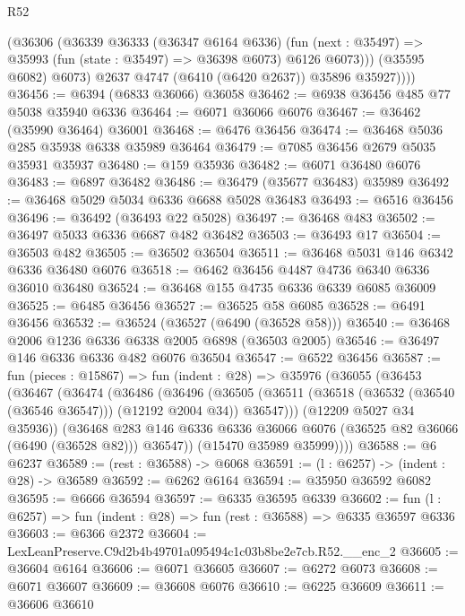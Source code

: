 \begin{lexlean}{R52}
\begin{coremodule}
              (@36306
                (@36339
                  @36333
                  (@36347 @6164 @6336)
                  (fun (next : @35497) =>
                  @35993 (fun (state : @35497) => @36398 @6073) @6126 @6073)))
              (@35595 @6082)
              @6073)
            @2637
            @4747
            (@6410 (@6420 @2637))
            @35896
            @35927))))
@36456 := @6394 (@6833 @36066) @36058
@36462 := @6938 @36456 @485 @77 @5038 @35940 @6336
@36464 := @6071 @36066 @6076
@36467 := @36462 (@35990 @36464) @36001
@36468 := @6476 @36456
@36474 := @36468 @5036 @285 @35938 @6338 @35989 @36464
@36479 := @7085 @36456 @2679 @5035 @35931 @35937
@36480 := @159 @35936
@36482 := @6071 @36480 @6076
@36483 := @6897 @36482
@36486 := @36479 (@35677 @36483) @35989
@36492 := @36468 @5029 @5034 @6336 @6688 @5028 @36483
@36493 := @6516 @36456
@36496 := @36492 (@36493 @22 @5028)
@36497 := @36468 @483
@36502 := @36497 @5033 @6336 @6687 @482 @36482
@36503 := @36493 @17
@36504 := @36503 @482
@36505 := @36502 @36504
@36511 := @36468 @5031 @146 @6342 @6336 @36480 @6076
@36518 := @6462 @36456 @4487 @4736 @6340 @6336 @36010 @36480
@36524 := @36468 @155 @4735 @6336 @6339 @6085 @36009
@36525 := @6485 @36456
@36527 := @36525 @58 @6085
@36528 := @6491 @36456
@36532 := @36524 (@36527 (@6490 (@36528 @58)))
@36540 := @36468 @2006 @1236 @6336 @6338 @2005 @6898 (@36503 @2005)
@36546 := @36497 @146 @6336 @6336 @482 @6076 @36504
@36547 := @6522 @36456
@36587 := fun (pieces : @15867) =>
  fun (indent : @28) =>
  @35976
    (@36055
      (@36453
        (@36467
          (@36474
            (@36486
              (@36496
                (@36505
                  (@36511 (@36518 (@36532 (@36540 (@36546 @36547))) (@12192 @2004 @34)) @36547)))
              (@12209 @5027 @34 @35936))
            (@36468
              @283
              @146
              @6336
              @6336
              @36066
              @6076
              (@36525 @82 @36066 (@6490 (@36528 @82)))
              @36547))
          (@15470 @35989 @35999))))
@36588 := @6 @6237
@36589 := (rest : @36588) -> @6068
@36591 := (l : @6257) -> (indent : @28) -> @36589
@36592 := @6262 @6164
@36594 := @35950 @36592 @6082
@36595 := @6666 @36594
@36597 := @6335 @36595 @6339
@36602 := fun (l : @6257) => fun (indent : @28) => fun (rest : @36588) => @6335 @36597 @6336
@36603 := @6366 @2372
@36604 := LexLeanPreserve.C9d2b4b49701a095494c1c03b8be2e7cb.R52.__enc_2
@36605 := @36604 @6164
@36606 := @6071 @36605
@36607 := @6272 @6073
@36608 := @6071 @36607
@36609 := @36608 @6076
@36610 := @6225 @36609
@36611 := @36606 @36610

\end{coremodule}
\end{lexlean}
